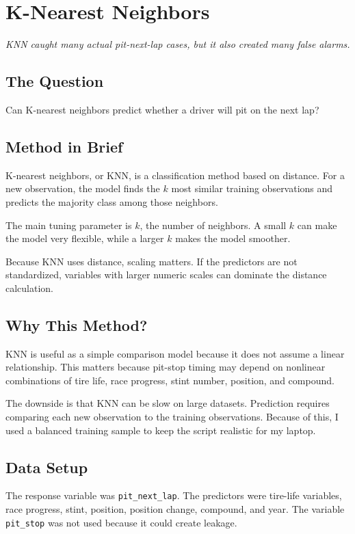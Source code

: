 \documentclass[11pt,oneside,openany]{book}
\newcommand{\chapterquote}[1]{%
\begin{center}
\small\textit{#1}
\end{center}
\vspace{-0.5em}
}
\begin{document}
\chapter{K-Nearest Neighbors}
\chapterquote{KNN caught many actual pit-next-lap cases, but it also created many false alarms.}

\section{The Question}

Can K-nearest neighbors predict whether a driver will pit on the next lap?

\section{Method in Brief}

K-nearest neighbors, or KNN, is a classification method based on distance. For a new observation, the model finds the \(k\) most similar training observations and predicts the majority class among those neighbors.

The main tuning parameter is \(k\), the number of neighbors. A small \(k\) can make the model very flexible, while a larger \(k\) makes the model smoother.

Because KNN uses distance, scaling matters. If the predictors are not standardized, variables with larger numeric scales can dominate the distance calculation.

\section{Why This Method?}

KNN is useful as a simple comparison model because it does not assume a linear relationship. This matters because pit-stop timing may depend on nonlinear combinations of tire life, race progress, stint number, position, and compound.

The downside is that KNN can be slow on large datasets. Prediction requires comparing each new observation to the training observations. Because of this, I used a balanced training sample to keep the script realistic for my laptop.

\section{Data Setup}

The response variable was \texttt{pit\_next\_lap}. The predictors were tire-life variables, race progress, stint, position, position change, compound, and year. The variable \texttt{pit\_stop} was not used because it could create leakage.
\end{document}
